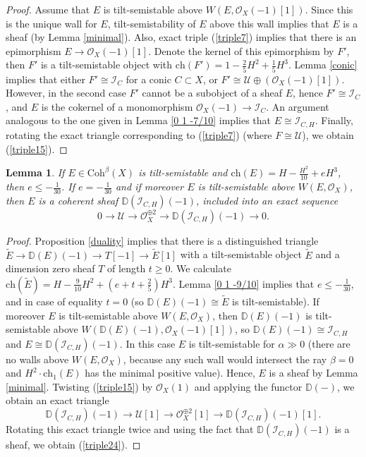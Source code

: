 \documentclass{amsart}
\newtheorem{lemma}[theorem]{Lemma}
\begin{document}
\begin{proof}
	Assume that $E$ is tilt-semistable above $W(E,\mathcal O_X(-1)[1])$. Since this is the unique wall for $E$, tilt-semistability of $E$ above this wall implies that $E$ is a sheaf (by Lemma \ref{minimal}). Also, exact triple (\ref{triple7}) implies that there is an epimorphism $E\to\mathcal O_X(-1)[1]$. Denote the kernel of this epimorphism by $F'$, then $F'$ is a tilt-semistable object with $\mathrm{ch}(F')=1-\frac 25H^2+\frac 15H^3$. Lemma \ref{conic} implies that either $F'\cong\mathcal I_C$ for a conic $C\subset X$, or $F'\cong\mathcal U\oplus(\mathcal O_X(-1)[1]).$ However, in the second case $F'$ cannot be a subobject of a sheaf $E$, hence $F'\cong\mathcal I_C$, and $E$ is the cokernel of a monomorphism $\mathcal O_X(-1)\to\mathcal I_C$. An argument analogous to the one given in Lemma \ref{0 1 -7/10} implies that $E\cong\mathcal I_{C,H}$. Finally, rotating the exact triangle corresponding to (\ref{triple7}) (where $F\cong\mathcal U$), we obtain (\ref{triple15}).
	\end{proof}
	
	\begin{lemma}\label{0 1 -1/10} If $E\in\mathrm{Coh}^\beta(X)$ is tilt-semistable and $\mathrm{ch}(E)=H-\frac{H^2}{10}+eH^3$, then $e\le-\frac{1}{30}$. If $e=-\frac{1}{30}$ and if moreover $E$ is tilt-semistable above $W(E,\mathcal O_X)$, then $E$ is a coherent sheaf $\mathbb D(\mathcal I_{C,H})(-1)$, included into an exact sequence
		\begin{equation}\label{triple24}0\to\mathcal U\to\mathcal O_X^{\oplus 2}\to \mathbb D(\mathcal I_{C,H})(-1)\to 0.
		\end{equation}
	\end{lemma}
	
	\begin{proof}Proposition \ref{duality} implies that there is a distinguished triangle $\widetilde{E}\to\mathbb D(E)(-1)\to T[-1]\to\widetilde{E}[1]$ with a tilt-semistable object $\widetilde{E}$ and a dimension zero sheaf $T$ of length $t\ge 0$. We calculate $\mathrm{ch}(\widetilde{E})=H-\frac{9}{10}H^2+(e+t+\frac 25)H^3$. Lemma \ref{0 1 -9/10} implies that $e\le-\frac{1}{30}$, and in case of equality $t=0$ (so $\mathbb D(E)(-1)\cong\widetilde{E}$ is tilt-semistable). If moreover $E$ is tilt-semistable above $W(E,\mathcal O_X)$, then $\mathbb D(E)(-1)$ is tilt-semistable above $W(\mathbb D(E)(-1),\mathcal O_X(-1)[1])$, so $\mathbb D(E)(-1)\cong\mathcal I_{C,H}$ and $E\cong\mathbb D(\mathcal I_{C,H})(-1)$. In this case $E$ is tilt-semistable for $\alpha\gg 0$ (there are no walls above $W(E,\mathcal O_X)$, because any such wall would intersect the ray $\beta=0$ and $H^2\cdot\mathrm{ch}_1(E)$ has the minimal positive value). Hence, $E$ is a sheaf by Lemma \ref{minimal}. 
	Twisting (\ref{triple15}) by $\mathcal O_X(1)$ and applying the functor $\mathbb D(-)$, we obtain an exact triangle
	\begin{equation}\label{triple25.2}\mathbb D(\mathcal I_{C,H})(-1)\to\mathcal U[1]\to\mathcal O_X^{\oplus 2}[1]\to\mathbb D(\mathcal I_{C,H})(-1)[1].
	\end{equation}
	Rotating this exact triangle twice and using the fact that $\mathbb D(\mathcal I_{C,H})(-1)$ is a sheaf, we obtain (\ref{triple24}). 
	\end{proof}
	
\end{document}
